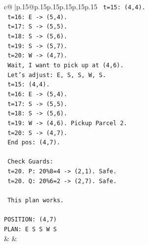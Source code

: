 \documentclass{article}
\begin{document}
{\begin{supertabular}{c@{$\;$}|p{.15\linewidth}@{}p{.15\linewidth}p{.15\linewidth}p{.15\linewidth}p{.15\linewidth}p{.15\linewidth}}
{{{\texttt{   t=15: (4,4).} \\
\texttt{   t=16: E {-}> (5,4).} \\
\texttt{   t=17: S {-}> (5,5).} \\
\texttt{   t=18: S {-}> (5,6).} \\
\texttt{   t=19: S {-}> (5,7).} \\
\texttt{   t=20: W {-}> (4,7).} \\
\texttt{   Wait, I want to pick up at (4,6).} \\
\texttt{   Let's adjust: E, S, S, W, S.} \\
\texttt{   t=15: (4,4).} \\
\texttt{   t=16: E {-}> (5,4).} \\
\texttt{   t=17: S {-}> (5,5).} \\
\texttt{   t=18: S {-}> (5,6).} \\
\texttt{   t=19: W {-}> (4,6). Pickup Parcel 2.} \\
\texttt{   t=20: S {-}> (4,7).} \\
\texttt{   End pos: (4,7).} \\
\\ 
\texttt{   Check Guards:} \\
\texttt{   t=20. P: 20\%8=4 {-}> (2,1). Safe.} \\
\texttt{   t=20. Q: 20\%6=2 {-}> (2,7). Safe.} \\
\\ 
\texttt{   This plan works.} \\
\\ 
\texttt{POSITION: (4,7)} \\
\texttt{PLAN: E S S W S} \\
            }
        }
    }
    & & \\ \\


\end{supertabular}}
\end{document}
